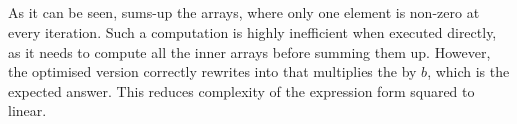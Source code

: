 \begin{code}%
%
\>[4]%
\>[14]\AgdaSymbol{:}\AgdaSpace{}%
%
\>[21]\AgdaSpace{}%
\AgdaSymbol{(}\AgdaSpace{}%
\AgdaSpace{}%
\AgdaSpace{}%
\AgdaSpace{}%
\AgdaSpace{}%
\AgdaSpace{}%
\AgdaSpace{}%
\AgdaSpace{}%
\AgdaSpace{}%
\AgdaSpace{}%
\AgdaSpace{}%
\AgdaSpace{}%
\AgdaSymbol{(}\AgdaSpace{}%
\AgdaSymbol{)}\AgdaSpace{}%
\AgdaSymbol{(}\AgdaSpace{}%
\AgdaSpace{}%
\AgdaSpace{}%
\AgdaSpace{}%
\AgdaSymbol{(}\AgdaSpace{}%
\AgdaSymbol{)}\AgdaSpace{}%
\AgdaSymbol{(}\AgdaSpace{}%
\AgdaSymbol{)))}\AgdaSpace{}%
\AgdaSpace{}%
\<%
\\
%
\>[4]%
\>[14]\AgdaSymbol{:}\AgdaSpace{}%
%
\>[21]\AgdaSpace{}%
\AgdaSpace{}%
\AgdaSpace{}%
\AgdaSpace{}%
\AgdaSpace{}%
\AgdaSymbol{(}\AgdaSpace{}%
\AgdaSpace{}%
\AgdaSpace{}%
\AgdaSpace{}%
\AgdaSymbol{(}\AgdaSpace{}%
\AgdaSymbol{)}\AgdaSpace{}%
\AgdaSymbol{)}\<%
\end{code}
\begin{code}[hide]%
%
\>[4]\AgdaSpace{}%
\AgdaSymbol{=}\AgdaSpace{}%
\<%
\\
%
\>[4]\AgdaSpace{}%
\AgdaSymbol{=}\AgdaSpace{}%
\<%
\\
\>[0]\<%
\\
\>[0]\<%
\end{code}
As it can be seen,  sums-up the arrays, where only one element is non-zero at
every iteration.  Such a computation is highly inefficient when executed directly,
as it needs to compute all the inner arrays before summing them up.  However, the
optimised version correctly rewrites  into  that multiplies
the  by $b$, which is the expected answer.  This reduces complexity
of the expression form squared to linear.

